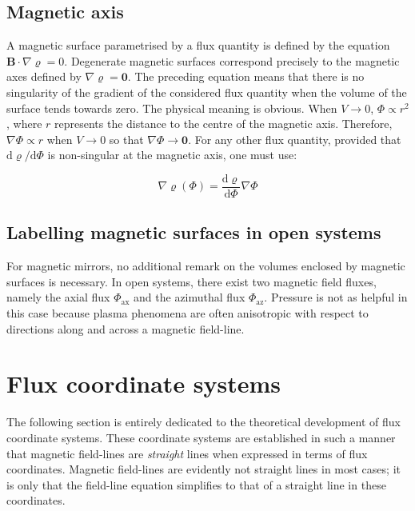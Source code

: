 \subsection{Magnetic axis}

A magnetic surface parametrised by a flux quantity is defined by the equation $\mathbf{B}\cdot\nabla\varrho=0$. Degenerate magnetic surfaces correspond precisely to the magnetic axes defined by $\nabla\varrho=\mathbf{0}$. The preceding equation means that there is no singularity of the gradient of the considered flux quantity when the volume of the surface tends towards zero. The physical meaning is obvious. When $V\to0$, $\Phi\propto r^2$, where $r$ represents the distance to the centre of the magnetic axis. Therefore, $\nabla\Phi\propto r$ when $V\to0$ so that $\nabla\Phi\to\mathbf{0}$. For any other flux quantity, provided that ${\mathrm{d}\varrho}/{\mathrm{d}\Phi}$ is non-singular at the magnetic axis, one must use:

\begin{equation}
    \nabla\varrho(\Phi)=\frac{\mathrm{d}\varrho}{\mathrm{d}\Phi}\nabla\Phi
\end{equation}

\subsection{Labelling magnetic surfaces in open systems}

For magnetic mirrors, no additional remark on the volumes enclosed by magnetic surfaces is necessary. In open systems, there exist two magnetic field fluxes, namely the axial flux $\Phi_\text{ax}$ and the azimuthal flux $\Phi_\text{az}$. Pressure is not as helpful in this case because plasma phenomena are often anisotropic with respect to directions along and across a magnetic field-line.

\section{Flux coordinate systems}

The following section is entirely dedicated to the theoretical development of flux coordinate systems. These coordinate systems are established in such a manner that magnetic field-lines are \textit{straight} lines when expressed in terms of flux coordinates. Magnetic field-lines are evidently not straight lines in most cases; it is only that the field-line equation simplifies to that of a straight line in these coordinates.

